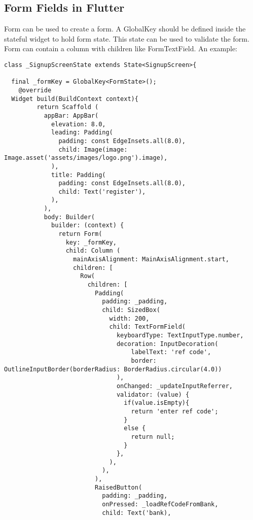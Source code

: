 \documentclass{article}
\begin{document}
\subsection{Form Fields in Flutter}
Form can be used to create a form. A GlobalKey should be defined inside the stateful widget to hold form state. This state can be used to validate the form. Form can contain a column with children like FormTextField. An example:  
\begin{lstlisting}
class _SignupScreenState extends State<SignupScreen>{

  final _formKey = GlobalKey<FormState>();
    @override
  Widget build(BuildContext context){
         return Scaffold (
           appBar: AppBar(
             elevation: 8.0,
             leading: Padding(
               padding: const EdgeInsets.all(8.0),
               child: Image(image: Image.asset('assets/images/logo.png').image),
             ),
             title: Padding(
               padding: const EdgeInsets.all(8.0),
               child: Text('register'),
             ),
           ),
           body: Builder(
             builder: (context) {
               return Form(
                 key: _formKey,
                 child: Column (
                   mainAxisAlignment: MainAxisAlignment.start,
                   children: [
                     Row(
                       children: [
                         Padding(
                           padding: _padding,
                           child: SizedBox(
                             width: 200,
                             child: TextFormField(
                               keyboardType: TextInputType.number,
                               decoration: InputDecoration(
                                   labelText: 'ref code',
                                   border: OutlineInputBorder(borderRadius: BorderRadius.circular(4.0))
                               ),
                               onChanged: _updateInputReferrer,
                               validator: (value) {
                                 if(value.isEmpty){
                                   return 'enter ref code';
                                 }
                                 else {
                                   return null;
                                 }
                               },
                             ),
                           ),
                         ),
                         RaisedButton(
                           padding: _padding,
                           onPressed: _loadRefCodeFromBank,
                           child: Text('bank),

\end{lstlisting}
\end{document}
